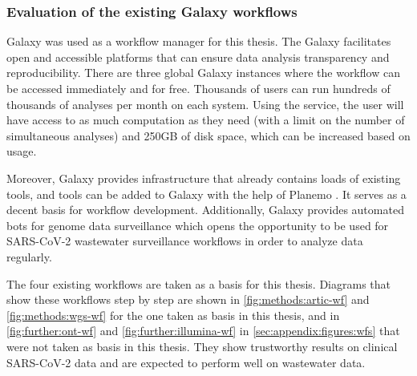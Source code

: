         \subsubsection{Evaluation of the existing Galaxy workflows} \label{sec:methods:existing}
        Galaxy was used as a workflow manager for this thesis. The Galaxy facilitates open and accessible platforms that can ensure data analysis transparency and reproducibility. There are three global Galaxy instances where the workflow can be accessed immediately and for free. Thousands of users can run hundreds of thousands of analyses per month on each system. Using the service, the user will have access to as much computation as they need (with a limit on the number of simultaneous analyses) and 250GB of disk space, which can be increased based on usage. 

        Moreover, Galaxy provides infrastructure that already contains loads of existing tools, and tools can be added to Galaxy with the help of Planemo \cite{planemo}. It serves as a decent basis for workflow development. Additionally, Galaxy provides automated bots \cite{bots2022} for genome data surveillance which opens the opportunity to be used for SARS-CoV-2 wastewater surveillance workflows in order to analyze data regularly.
        
        The four existing workflows are taken as a basis for this thesis. Diagrams that show these workflows step by step are shown in \cref{fig:methods:artic-wf} and \cref{fig:methods:wgs-wf} for the one taken as basis in this thesis, and in \cref{fig:further:ont-wf} and \cref{fig:further:illumina-wf} in \cref{sec:appendix:figures:wfs} that were not taken as basis in this thesis. They show trustworthy results on clinical SARS-CoV-2 data and are expected to perform well on wastewater data. 
        

